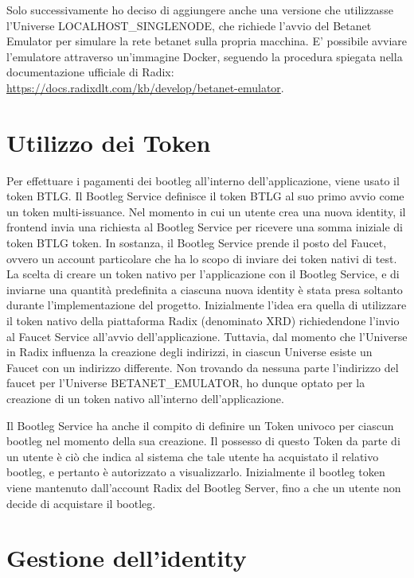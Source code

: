 Solo successivamente ho deciso di aggiungere anche una versione che utilizzasse l'Universe LOCALHOST\_SINGLENODE, che richiede l'avvio del Betanet Emulator per simulare la rete betanet sulla propria macchina. E' possibile avviare l'emulatore attraverso un'immagine Docker, seguendo la procedura spiegata nella documentazione ufficiale di Radix: \url{https://docs.radixdlt.com/kb/develop/betanet-emulator}. 

\section{Utilizzo dei Token}

Per effettuare i pagamenti dei bootleg all'interno dell'applicazione, viene usato il token BTLG. Il Bootleg Service definisce il token BTLG al suo primo avvio come un token multi-issuance. Nel momento in cui un utente crea una nuova identity, il frontend invia una richiesta al Bootleg Service per ricevere una somma iniziale di token BTLG token. In sostanza, il Bootleg Service prende il posto del Faucet, ovvero un account particolare che ha lo scopo di inviare dei token nativi di test. La scelta di creare un token nativo per l'applicazione con il Bootleg Service, e di inviarne una quantità predefinita a ciascuna nuova identity è stata presa soltanto durante l'implementazione del progetto. Inizialmente l'idea era quella di utilizzare il token nativo della piattaforma Radix (denominato XRD) richiedendone l'invio al Faucet Service all'avvio dell'applicazione. Tuttavia, dal momento che l'Universe in Radix influenza la creazione degli indirizzi, in ciascun Universe esiste un Faucet con un indirizzo differente. Non trovando da nessuna parte l'indirizzo del faucet per l'Universe BETANET\_EMULATOR, ho dunque optato per la creazione di un token nativo all'interno dell'applicazione.

Il Bootleg Service ha anche il compito di definire un Token univoco per ciascun bootleg nel momento della sua creazione. Il possesso di questo Token da parte di un utente è ciò che indica al sistema che tale utente ha acquistato il relativo bootleg, e pertanto è autorizzato a visualizzarlo. Inizialmente il bootleg token viene mantenuto dall'account Radix del Bootleg Server, fino a che un utente non decide di acquistare il bootleg.

\section{Gestione dell'identity}

